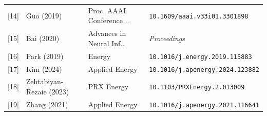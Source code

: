\documentclass[
  journal]{IEEEtran}
\begin{document}
\begin{table}[!t]
\begin{tabular}{rlll}
{[14]} & Guo (2019) & Proc. AAAI Conference .. & \texttt{10.1609/aaai.v33i01.3301898} \\
{[15]} & Bai (2020) & Advances in Neural Inf.. & \textit{Proceedings} \\
{[16]} & Park (2019) & Energy & \texttt{10.1016/j.energy.2019.115883} \\
{[17]} & Kim (2024) & Applied Energy & \texttt{10.1016/j.apenergy.2024.123882} \\
{[18]} & Zehtabiyan-Rezaie (2023) & PRX Energy & \texttt{10.1103/PRXEnergy.2.013009} \\
{[19]} & Zhang (2021) & Applied Energy & \texttt{10.1016/j.apenergy.2021.116641} \\
\bottomrule
\end{tabular}
\end{table}
\end{document}
